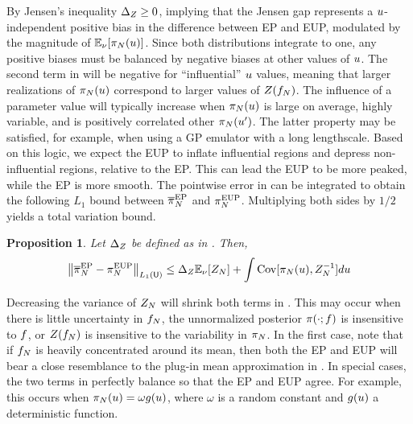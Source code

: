 \documentclass[12pt]{article}
\newtheorem{prop}{Proposition}
\begin{document}
By Jensen's inequality $\Delta_Z \geq 0$, implying that the Jensen gap represents a 
$u$-independent positive bias in the difference between EP and EUP, modulated by the magnitude of 
$\mathbb{E}_{\nu_{}}[\pi_{N}(u)]$. Since both distributions integrate to one, any positive 
biases must be balanced by negative biases at other values of $u$.
The second term in  will be negative for ``influential'' $u$ values, 
meaning that larger realizations of $\pi_{N}(u)$ correspond to larger values of 
$Z(f_{N})$. The influence of a parameter value will typically increase when 
$\pi_{N}(u)$ is large on average, highly variable, and is positively correlated other 
$\pi_{N}(u^\prime)$. The latter property may be satisfied, for example, when using 
a GP emulator with a long lengthscale. Based on this logic, we expect the EUP to inflate 
influential regions and depress non-influential regions, relative to the EP. This can lead 
the EUP to be more peaked, while the EP is more smooth. The pointwise error in 
 can be integrated to obtain the following $L_1$ bound 
between $\overline{\pi}_{N}^{\mathrm{EP}}$ and $\pi_{N}^{\mathrm{EUP}}$. Multiplying both sides by $1/2$
yields a total variation bound.

\begin{prop} \label{prop:ep-eup-TV-err}
Let $\Delta_Z$ be defined as in . Then,
\begin{equation}
\left\lVert\overline{\pi}_{N}^{\mathrm{EP}} - \pi_{N}^{\mathrm{EUP}}\right\rVert_{L_1(\mathsf{U})}
\leq \Delta_Z \mathbb{E}_{\nu_{}}[Z_{N}] + \int \mathrm{Cov}[\pi_{N}(u), Z_{N}^{-1}] du
\label{eq:ep-eup-TV-err}
\end{equation}
\end{prop}

Decreasing the variance of $Z_{N}$ will shrink both terms in 
. This may occur when there is little 
uncertainty in $f_{N}$, the unnormalized posterior $\pi(\cdot; f)$
is insensitive to $f$, or $Z(f_{N})$ is insensitive to the variability 
in $\pi_{N}$. In the first case, note that if $f_{N}$ is heavily 
concentrated around its mean, then both the EP and EUP will bear a close resemblance
to the plug-in mean approximation in .
In special cases, the two terms in  perfectly balance so that 
the EP and EUP agree. For example, this occurs when 
$\pi_{N}(u) = \omega g(u)$, where $\omega$ is a random constant and 
$g(u)$ a deterministic function. 
\end{document}
